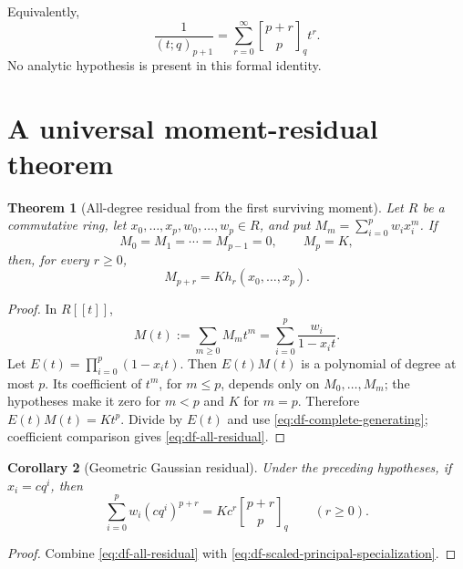 \documentclass[11pt,oneside,openany]{book}
\newtheorem{theorem}{Theorem}[chapter]
\newtheorem{corollary}[theorem]{Corollary}
\theoremstyle{definition}
\theoremstyle{remark}
\newcommand{\Qbinom}[3]{\genfrac{[}{]}{0pt}{}{#1}{#2}_{#3}}
\begin{document}
Equivalently,
\begin{equation}
 \frac1{(t;q)_{p+1}}
 =\sum_{r=0}^{\infty}\Qbinom{p+r}{p}q t^r.
 \label{eq:df-finite-reciprocal}
\end{equation}
No analytic hypothesis is present in this formal identity.

\section{A universal moment-residual theorem}

\begin{theorem}[All-degree residual from the first surviving moment]
\label{thm:df-universal-residual}
Let $R$ be a commutative ring, let $x_0,\ldots,x_p,w_0,\ldots,w_p\in R$, and
put $M_m=\sum_{i=0}^{p}w_ix_i^m$.  If
\begin{equation}
 M_0=M_1=\cdots=M_{p-1}=0,
 \qquad M_p=K,
 \label{eq:df-moment-hypotheses}
\end{equation}
then, for every $r\ge0$,
\begin{equation}
 M_{p+r}=K h_r(x_0,\ldots,x_p).
 \label{eq:df-all-residual}
\end{equation}
\end{theorem}

\begin{proof}
In $R[[t]]$,
\[
 M(t):=\sum_{m\ge0}M_mt^m
 =\sum_{i=0}^{p}\frac{w_i}{1-x_it}.
\]
Let $E(t)=\prod_{i=0}^{p}(1-x_it)$.  Then $E(t)M(t)$ is a polynomial of
degree at most $p$.  Its coefficient of $t^m$, for $m\le p$, depends only on
$M_0,\ldots,M_m$; the hypotheses make it zero for $m<p$ and $K$ for $m=p$.
Therefore $E(t)M(t)=Kt^p$.  Divide by $E(t)$ and use
\eqref{eq:df-complete-generating}; coefficient comparison gives
\eqref{eq:df-all-residual}.
\end{proof}

\begin{corollary}[Geometric Gaussian residual]
\label{cor:df-geometric-residual}
Under the preceding hypotheses, if $x_i=cq^i$, then
\begin{equation}
 \sum_{i=0}^{p}w_i(cq^i)^{p+r}
 =Kc^r\Qbinom{p+r}{p}q
 \qquad(r\ge0).
 \label{eq:df-geometric-residual}
\end{equation}
\end{corollary}

\begin{proof}
Combine \eqref{eq:df-all-residual} with
\eqref{eq:df-scaled-principal-specialization}.
\end{proof}
\end{document}
